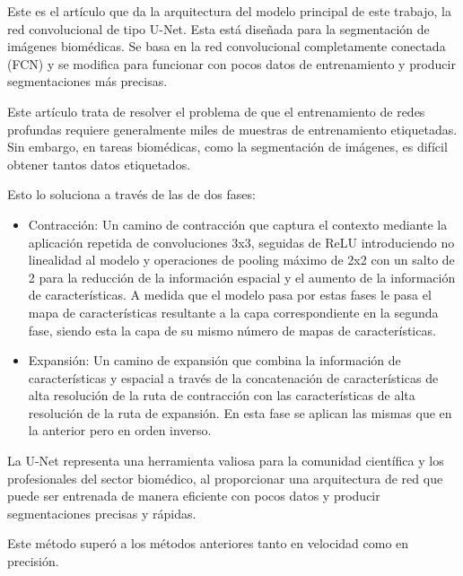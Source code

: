 Este es el artículo que da la arquitectura del modelo principal de este trabajo, la red convolucional de tipo U-Net. Esta está diseñada para la segmentación de imágenes biomédicas. Se basa en la red convolucional completamente conectada (FCN) y se modifica para funcionar con pocos datos de entrenamiento y producir segmentaciones más precisas.

Este artículo trata de resolver el problema de que el entrenamiento de redes profundas requiere generalmente miles de muestras de entrenamiento etiquetadas. Sin embargo, en tareas biomédicas, como la segmentación de imágenes, es difícil obtener tantos datos etiquetados.

Esto lo soluciona a través de las de dos fases:

\begin{itemize}
	
	\item{Contracción}: Un camino de contracción que captura el contexto mediante la aplicación repetida de convoluciones 3x3, seguidas de ReLU introduciendo no linealidad al modelo y operaciones de pooling máximo de 2x2 con un salto de 2 para la reducción de la información espacial y el aumento de la información de características. A medida que el modelo pasa por estas fases le pasa el mapa de características resultante a la capa correspondiente en la segunda fase, siendo esta la capa de su mismo número de mapas de características.
	
	\item{Expansión}: Un camino de expansión que combina la información de características y espacial a través de la concatenación de características de alta resolución de la ruta de contracción con las características de alta resolución de la ruta de expansión.
	En esta fase se aplican las mismas que en la anterior pero en orden inverso.
	
\end{itemize}

La U-Net representa una herramienta valiosa para la comunidad científica y los profesionales del sector biomédico, al proporcionar una arquitectura de red que puede ser entrenada de manera eficiente con pocos datos y producir segmentaciones precisas y rápidas.

Este método superó a los métodos anteriores tanto en velocidad como en precisión.

